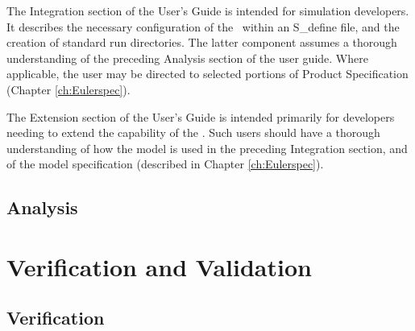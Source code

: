 The Integration section of the User's Guide is intended for simulation
developers.
It describes the necessary configuration of the \EulerDesc\
within an
S\_define file, and the creation of standard run directories.  The
latter
component assumes a thorough understanding of the preceding Analysis
section of the user guide.
Where applicable, the user may be directed to selected portions of
Product Specification (Chapter \ref{ch:Eulerspec}).

The Extension section of the User's Guide is intended primarily for
developers
needing to extend the capability of the \EulerDesc.  Such users
should have a
thorough understanding of how the model is used in the preceding
Integration section, and of the model
specification (described in Chapter \ref{ch:Eulerspec}).


\section{Analysis}






\chapter{Verification and
Validation}\label{ch:Eulerivv}

\section{Verification}





